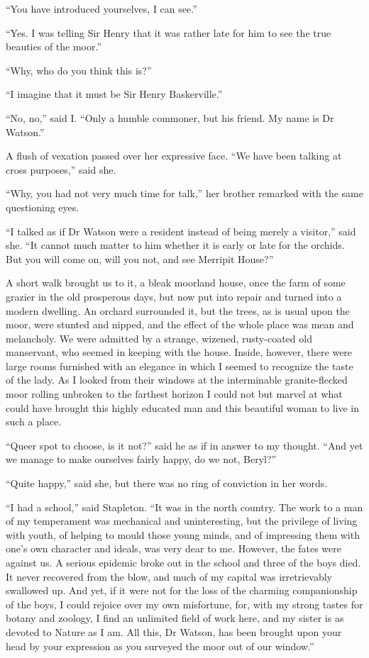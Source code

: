 \documentclass[paper=5.5in:8.5in,BCOR=7mm,twoside,DIV=calc,12pt,usegeometry,openany,chapterprefix,endperiod,headings=big]{scrbook} %
\begin{document}
\enquote{You have introduced yourselves, I can see.}

\enquote{Yes. I was telling Sir Henry that it was rather late for him to see the true beauties of the moor.}

\enquote{Why, who do you think this is?}

\enquote{I imagine that it must be Sir Henry Baskerville.}

\enquote{No, no,} said I. \enquote{Only a humble commoner, but his friend. My name is Dr Watson.}

A flush of vexation passed over her expressive face. \enquote{We have been talking at cross purposes,} said she.

\enquote{Why, you had not very much time for talk,} her brother remarked with the same questioning eyes.

\enquote{I talked as if Dr Watson were a resident instead of being merely a visitor,} said she. \enquote{It cannot much matter to him whether it is early or late for the orchids. But you will come on, will you not, and see Merripit House?}

A short walk brought us to it, a bleak moorland house, once the farm of some grazier in the old prosperous days, but now put into repair and turned into a modern dwelling. An orchard surrounded it, but the trees, as is usual upon the moor, were stunted and nipped, and the effect of the whole place was mean and melancholy. We were admitted by a strange, wizened, rusty-coated old manservant, who seemed in keeping with the house. Inside, however, there were large rooms furnished with an elegance in which I seemed to recognize the taste of the lady. As I looked from their windows at the interminable granite-flecked moor rolling unbroken to the farthest horizon I could not but marvel at what could have brought this highly educated man and this beautiful woman to live in such a place.

\enquote{Queer spot to choose, is it not?} said he as if in answer to my thought. \enquote{And yet we manage to make ourselves fairly happy, do we not, Beryl?}

\enquote{Quite happy,} said she, but there was no ring of conviction in her words.

\enquote{I had a school,} said Stapleton. \enquote{It was in the north country. The work to a man of my temperament was mechanical and uninteresting, but the privilege of living with youth, of helping to mould those young minds, and of impressing them with one's own character and ideals, was very dear to me. However, the fates were against us. A serious epidemic broke out in the school and three of the boys died. It never recovered from the blow, and much of my capital was irretrievably swallowed up. And yet, if it were not for the loss of the charming companionship of the boys, I could rejoice over my own misfortune, for, with my strong tastes for botany and zoology, I find an unlimited field of work here, and my sister is as devoted to Nature as I am. All this, Dr Watson, has been brought upon your head by your expression as you surveyed the moor out of our window.}
\end{document}
